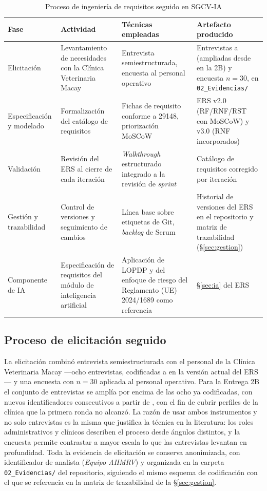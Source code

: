 \begin{table}[H]
\centering\footnotesize
\caption{Proceso de ingeniería de requisitos seguido en SGCV-IA}
\label{tab:proceso}
\begin{tabular}{|C{2.6cm}|L{4.0cm}|L{4.6cm}|L{4.6cm}|}
\hline
{}\textbf{Fase} & \textbf{Actividad} & \textbf{Técnicas empleadas} & \textbf{Artefacto producido}\\ \hline
Elicitación & Levantamiento de necesidades con la Clínica Veterinaria Macay & Entrevista semiestructurada, encuesta al personal operativo & Entrevistas  a  (ampliadas desde  en la 2B) y encuesta $n=30$, en \texttt{02\_Evidencias/}\\ \hline
Especificación y modelado & Formalización del catálogo de requisitos & Fichas de requisito conforme a 29148, priorización MoSCoW & ERS v2.0 (RF/RNF/RST con MoSCoW) y v3.0 (RNF incorporados)\\ \hline
Validación & Revisión del ERS al cierre de cada iteración & \emph{Walkthrough} estructurado integrado a la revisión de \emph{sprint} & Catálogo de requisitos corregido por iteración\\ \hline
Gestión y trazabilidad & Control de versiones y seguimiento de cambios & Línea base sobre etiquetas de Git, \emph{backlog} de Scrum & Historial de versiones del ERS en el repositorio y matriz de trazabilidad (\S\ref{sec:gestion})\\ \hline
Componente de IA & Especificación de requisitos del módulo de inteligencia artificial & Aplicación de LOPDP y del enfoque de riesgo del Reglamento (UE) 2024/1689 como referencia & \S\ref{sec:ia} del ERS\\ \hline
\end{tabular}
\end{table}
 
\subsection{Proceso de elicitación seguido}
 
La elicitación combinó entrevista semiestructurada con el personal de la Clínica Veterinaria Macay
---ocho entrevistas, codificadas  a  en la versión actual del ERS--- y una
encuesta con $n=30$ aplicada al personal operativo. Para la Entrega 2B el conjunto de entrevistas se
amplía por encima de las ocho ya codificadas, con nuevos identificadores consecutivos a partir de
, con el fin de cubrir perfiles de la clínica que la primera ronda no alcanzó. La razón de
usar ambos instrumentos y no solo entrevistas es la misma que
justifica la técnica en la literatura: los roles administrativos y clínicos describen el proceso
desde ángulos distintos, y la encuesta permite contrastar a mayor escala lo que las entrevistas
levantan en profundidad. Toda la evidencia de elicitación se conserva anonimizada, con identificador
de analista (\emph{Equipo AHMRV}) y organizada en la carpeta \texttt{02\_Evidencias/} del
repositorio, siguiendo el mismo esquema de codificación con el que se referencia en la matriz de
trazabilidad de la \S\ref{sec:gestion}.
 
